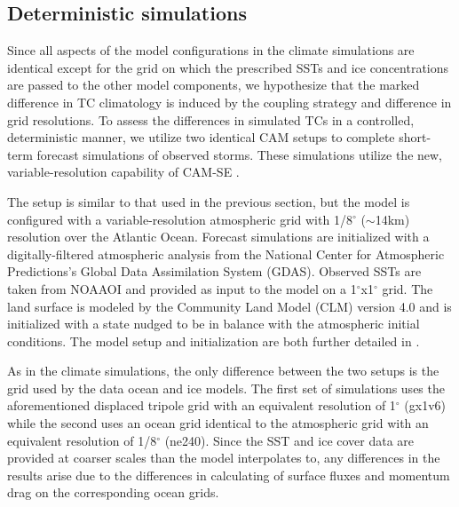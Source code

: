 \documentclass[draft,ms]{AGUTeX}
\newcommand{\degree}{$^{\circ}$}
\newcommand{\texttilde}{$\sim$}
\begin{document}
\begin{article}

\section{Deterministic simulations}
\label{sec:forecast}

Since all aspects of the model configurations in the climate simulations are identical except for the grid on which the prescribed SSTs and ice concentrations are passed to the other model components, we hypothesize that the marked difference in TC climatology is induced by the coupling strategy and difference in grid resolutions. To assess the differences in simulated TCs in a controlled, deterministic manner, we utilize two identical CAM setups to complete short-term forecast simulations of observed storms. These simulations utilize the new, variable-resolution capability of CAM-SE \citep{Zarzycki2014APE}.

The setup is similar to that used in the previous section, but the model is configured with a variable-resolution atmospheric grid with 1/8\degree{} (\texttilde{}14km) resolution over the Atlantic Ocean. Forecast simulations are initialized with a digitally-filtered atmospheric analysis from the National Center for Atmospheric Predictions's Global Data Assimilation System (GDAS). Observed SSTs are taken from NOAAOI and provided as input to the model on a 1\degree{}x1\degree{} grid. The land surface is modeled by the Community Land Model (CLM) version 4.0 and is initialized with a state nudged to be in balance with the atmospheric initial conditions. The model setup and initialization are both further detailed in \citet{Zarzycki2015TCForecast}.

As in the climate simulations, the only difference between the two setups is the grid used by the data ocean and ice models. The first set of simulations uses the aforementioned displaced tripole grid with an equivalent resolution of 1\degree{} (gx1v6) while the second uses an ocean grid identical to the atmospheric grid with an equivalent resolution of 1/8\degree{} (ne240). Since the SST and ice cover data are provided at coarser scales than the model interpolates to, any differences in the results arise due to the differences in calculating of surface fluxes and momentum drag on the corresponding ocean grids.


\end{article}
\end{document}
